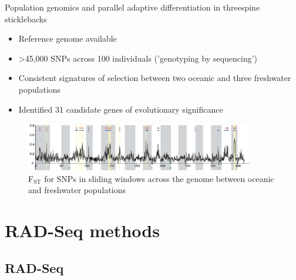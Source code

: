 \documentclass[presentation]{beamer}
\begin{document}
\begin{frame}[label=sec-1-0-5]{Population genomics and parallel adaptive differentiation in threespine sticklebacks}
\begin{itemize}
\item Reference genome available
\item >45,000 SNPs across 100 individuals ('genotyping by sequencing')
\item Consistent signatures of selection between two oceanic and three
freshwater populations
\item Identified 31 candidate genes of evolutionary significance
\end{itemize}


\begin{figure}[htb]
\centering
\includegraphics[width=10cm]{Hohenlohe2010Fig6e.png}
\caption{F\(_{\text{ST}}\) for SNPs in sliding windows across the genome between oceanic and freshwater populations}
\end{figure}


\begin{center}
\tiny{\citep{Hohenlohe2010}}
\end{center}
\end{frame}




\section{RAD-Seq methods}
\label{sec-2}

\subsection{RAD-Seq}
\label{sec-2-1}
\end{document}
